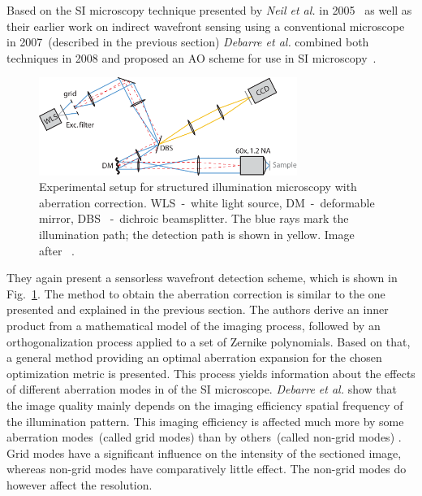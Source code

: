 Based on the SI microscopy technique presented by \emph{Neil et al.} in 2005~\cite{wide_structured_illu_principle} as well as their earlier work on indirect wavefront sensing using a conventional microscope~\cite{wide_AOM_loew_freq} in 2007~(described in the previous section) \emph{Debarre et al.} combined both techniques in 2008 and proposed an AO scheme for use in SI microscopy~\cite{wide_AOM_structured_illu}.  

\begin{figure}[hbt]
	\centering
		\includegraphics[width=0.75\textwidth]{images/wide_structured_illumination.pdf}
	\caption{Experimental setup for structured illumination microscopy with 
aberration correction. WLS~-~white light source, DM~-~deformable mirror, DBS
~-~dichroic beamsplitter. The blue rays mark the illumination path; the 
detection path is shown in yellow. Image after~\cite{wide_AOM_structured_illu}
.}
	\label{fig:wide_structured_illumination}
\end{figure}

They again present a sensorless wavefront detection scheme, which is shown in Fig.~\ref{fig:wide_structured_illumination}. The method to obtain the aberration correction is similar to the one presented and explained in the previous section. 
The authors derive an inner product from a mathematical model of the imaging process, followed by an orthogonalization process applied to a set of Zernike polynomials. Based on that, a general method providing an optimal aberration expansion for the chosen optimization metric is presented. This process yields  information about the effects of different aberration modes in of the SI microscope. \emph{Debarre et al.} show that the image quality mainly depends on the imaging efficiency spatial frequency of the illumination pattern. This imaging efficiency is affected much more by some aberration modes~(called grid modes) than by others~(called non-grid modes) . Grid modes have a significant influence on the intensity of the sectioned image, whereas non-grid modes have comparatively little effect. The non-grid modes do however affect the resolution. 

